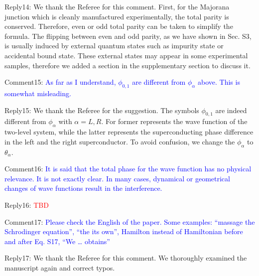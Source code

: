 \documentclass[onecolumn,preprintnumbers,amsmath,amssymb,prb]{revtex4}
\newcommand{\red}[1]{\textcolor{red}{#1}}
\newcommand{\blue}[1]{\textcolor{blue}{#1}}
\begin{document}
\vspace{5mm}


\noindent Reply14: We thank the Referee for this comment. First, for the Majorana junction which is cleanly manufactured experimentally, the total parity is conserved. Therefore, even or odd total parity can be taken to simplify the formula. The flipping between even and odd parity, as we have shown in Sec. S3, is usually induced by external quantum states such as impurity state or accidental bound state. These external states may appear in some experimental samples, therefore we added a section in the supplementary section to discuss it. 


\vspace{5mm}

\noindent Comment15:
\blue{As far as I understand, $\phi_{0,1}$ are different from $\phi_{\alpha}$
above. This is somewhat misleading.}
\vspace{5mm}


\noindent Reply15: We thank the Referee for the suggestion. The symbols $\phi_{0,1}$ are indeed different from $\phi_{\alpha}$ with $\alpha = L,R$. For former represents the wave function of the two-level system, while the latter represents the superconducting phase difference in the left and the right superconductor. To avoid confusion, we change the $\phi_{\alpha}$ to $\theta_\alpha$. 


\vspace{5mm}

\noindent Comment16:
\blue{It is said that the total phase for the wave function has no physical
relevance. It is not exactly clear. In many cases, dynamical or
geometrical changes of wave functions result in the interference.}
\vspace{5mm}


\noindent Reply16: \red{TBD}



\vspace{5mm}

\noindent Comment17:
\blue{Please check the English of the paper. Some examples: “massage the
Schrodinger equation”, “the its own”, Hamilton instead of Hamiltonian
before and after Eq. S17, “We … obtains”}
\vspace{5mm}


\noindent Reply17: We thank the Referee for this comment. We thoroughly examined the manuscript again and correct typos. 


\vspace{5mm}
\end{document}
